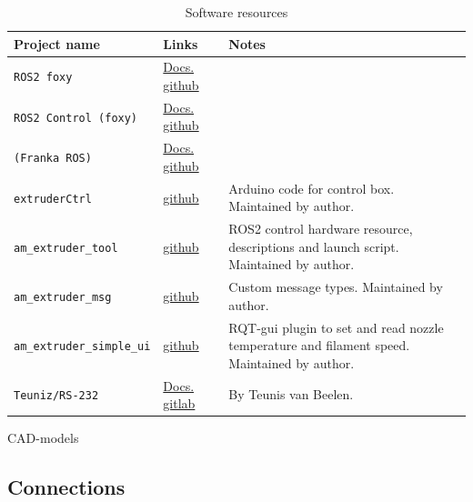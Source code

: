 \documentclass[10pt]{article}
\begin{document}
\begin{table}[h]
	\centering
	{
	\captionsetup{width=\linewidth}
	\caption{Software resources}
	\label{}
	}
	\vspace{-0.6em}
	\setlength\tabcolsep{6pt} %
	\begin{tabular}{p{0.25\linewidth}p{0.15\linewidth}p{0.6\linewidth}}
	\toprule
	Project name & Links & Notes \\
	\midrule
	\texttt{ROS2 foxy} & \href{https://docs.ros.org/en/foxy}{Docs.} \href{https://github.com/ros2}{github} \\[3pt]
	\texttt{ROS2 Control (foxy)} & \href{https://control.ros.org/index}{Docs.} \href{https://github.com/ros-controls/ros2_control}{github} \\[3pt]
	\texttt{(Franka ROS)} & \href{https://frankaemika.github.io/docs/franka_ros}{Docs.} \href{https://github.com/frankaemika}{github} \\[3pt]
	\texttt{extruderCtrl} & \href{https://github.com/mltmyr/extruderCtrl}{github} & Arduino code for control box. Maintained by author. \\[3pt]
	\texttt{am\_extruder\_tool} & \href{https://github.com/mltmyr/am_extruder_tool}{github} & ROS2 control hardware resource, descriptions and launch script. Maintained by author. \\[3pt]
	\texttt{am\_extruder\_msg} & \href{https://github.com/mltmyr/am_extruder_msg}{github} & Custom message types. Maintained by author. \\[3pt]
	\texttt{am\_extruder\_simple\_ui} & \href{https://github.com/mltmyr/am_extruder_simple_ui}{github} & RQT-gui plugin to set and read nozzle temperature and filament speed. Maintained by author. \\[3pt]
	\texttt{Teuniz/RS-232} & \href{https://www.teuniz.net/RS-232/}{Docs.} \href{https://gitlab.com/Teuniz/RS-232}{gitlab} & By Teunis van Beelen. \\[3pt]
	\bottomrule
	\end{tabular}
\end{table}

CAD-models


\subsection{Connections}
\end{document}
